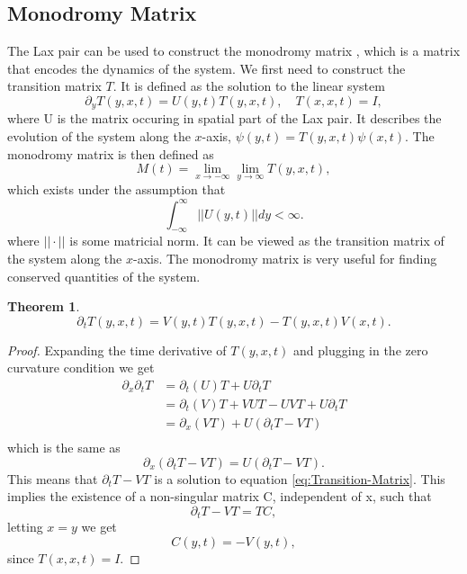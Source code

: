 \documentclass[english,master]{liumaiex}
\theoremstyle{plain}
\newtheorem{theorem}[proposition]{Theorem}
\theoremstyle{definition}
\begin{document}
\subsection{Monodromy Matrix}
The Lax pair can be used to construct the monodromy matrix \cite{Avendano2008,Krishnaswami_2021}, which is a matrix that encodes the dynamics of the system. We first need to construct the transition matrix $T$. It is defined as the solution to the linear system
\begin{equation}
	\partial_y T(y,x,t) = U(y,t) T(y,x,t), \quad T(x,x,t) = I,
\end{equation}
where U is the matrix occuring in spatial part of the Lax pair. It describes the evolution of the system along the $x$-axis, $\psi(y,t) = T(y,x,t) \psi(x, t)$. The monodromy matrix is then defined as
\begin{equation}
	M(t) =
		\lim_{x \rightarrow -\infty} \lim_{y \rightarrow \infty} T(y,x,t),
\end{equation}
which exists under the assumption that
\begin{equation}
	\int_{-\infty}^{\infty} ||U(y,t)|| dy < \infty.
\end{equation}
where $||\cdot||$ is some matricial norm. It can be viewed as the transition matrix of the system along the $x$-axis. The monodromy matrix is very useful for finding conserved quantities of the system.
\begin{theorem}
	\begin{equation} \label{eq:Transition-Matrix}
		\partial_t T(y,x,t) = V(y,t) T(y,x,t) - T(y,x,t) V(x,t).
	\end{equation}
\end{theorem}
\begin{proof}
	Expanding the time derivative of $T(y,x,t)$ and plugging in the zero curvature condition we get
	\begin{equation}
	\begin{aligned}
		\partial_x \partial_t T
			&= \partial_t (U) T + U \partial_t T \\
			&= \partial_t (V)T + VUT - UVT + U \partial_t T \\
			&= \partial_x (VT) + U(\partial_t T - VT) \\
	\end{aligned}
	\end{equation}
	which is the same as
	\begin{equation}
		\partial_x (\partial_t T - VT) = U(\partial_t T - VT).
	\end{equation}
	This means that $\partial_t T - VT$ is a solution to equation \eqref{eq:Transition-Matrix}.
	This implies the existence of a non-singular matrix C, independent of x, such that
	\begin{equation}
		\partial_t T - VT = TC,
	\end{equation}
	letting $x = y$ we get
	\begin{equation}
		C(y,t) = -V(y,t),
	\end{equation}
	since $T(x,x,t) = I$.
\end{proof}
\end{document}
